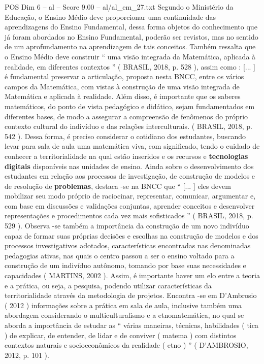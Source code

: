\begin{textsample}{POS Dim 6 – al – Score 9.00 – al/al\_em\_27.txt}
Segundo o Ministério da Educação, o Ensino Médio deve proporcionar uma continuidade das aprendizagens do Ensino Fundamental, dessa forma objetos do conhecimento que já foram abordados no Ensino Fundamental, poderão ser revistos, mas no sentido de um aprofundamento na aprendizagem de tais conceitos.
Também ressalta que o Ensino Médio deve construir “ uma visão integrada da Matemática, aplicada à realidade, em diferentes contextos ” ( BRASIL, 2018, p. 528 ), assim como : [... ] é fundamental preservar a articulação, proposta nesta BNCC, entre os vários campos da Matemática, com vistas à construção de uma visão integrada de Matemática e aplicada à realidade.
Além disso, é importante que os saberes matemáticos, do ponto de vista pedagógico e didático, sejam fundamentados em diferentes bases, de modo a assegurar a compreensão de fenômenos do próprio contexto cultural do indivíduo e das relações interculturais. ( BRASIL, 2018, p. 542 ).
Dessa forma, é preciso considerar o cotidiano dos estudantes, buscando levar para sala de aula uma matemática viva, com significado, tendo o cuidado de conhecer a territorialidade na qual estão inseridos e os recursos e \textbf{tecnologias} \textbf{digitais} disponíveis nas unidades de ensino.
Ainda sobre o desenvolvimento dos estudantes em relação aos processos de investigação, de construção de modelos e de resolução de \textbf{problemas}, destaca -se na BNCC que “ [... ] eles devem mobilizar seu modo próprio de raciocinar, representar, comunicar, argumentar e, com base em discussões e validações conjuntas, aprender conceitos e desenvolver representações e procedimentos cada vez mais sofisticados ” ( BRASIL, 2018, p. 529 ).
Observa -se também a importância da construção de um novo indivíduo capaz de formar suas próprias decisões e escolhas na construção de modelos e dos processos investigativos adotados, características encontradas nas denominadas pedagogias ativas, nas quais o centro passou a ser o ensino voltado para a construção de um indivíduo autônomo, tomando por base suas necessidades e capacidades ( MARTINS, 2002 ).
Assim, é importante haver um elo entre a teoria e a prática, ou seja, a pesquisa, podendo utilizar características da territorialidade através da metodologia de projetos.
Encontra -se em D’Ambrosio ( 2012 ) informações sobre a prática em sala de aula, inclusive também uma abordagem considerando o multiculturalismo e a etnomatemática, no qual se aborda a importância de estudar as “ várias maneiras, técnicas, habilidades ( tica ) de explicar, de entender, de lidar e de conviver ( matema ) com distintos contextos naturais e socioeconômicos da realidade ( etno ) ” ( D’AMBROSIO, 2012, p. 101 ).

\end{textsample}
